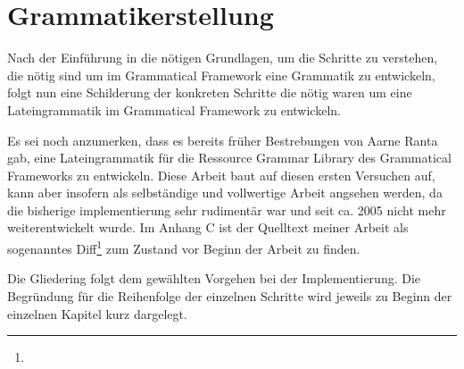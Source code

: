 \documentclass[12pt,abstract=on,titlepage,bibliography=totoc,ngerman,listof=totoc]{scrreprt}
\begin{document}
\chapter{Grammatikerstellung}
\label{chap:grammatik}
Nach der Einführung in die nötigen Grundlagen, um die Schritte zu verstehen, die nötig sind um im Grammatical Framework eine Grammatik zu entwickeln, folgt nun eine Schilderung der konkreten Schritte die nötig waren um eine Lateingrammatik im Grammatical Framework zu entwickeln. \par
Es sei noch anzumerken, dass es bereits früher Bestrebungen von Aarne Ranta gab, eine Lateingrammatik für die Ressource Grammar Library des Grammatical Frameworks zu entwickeln. Diese Arbeit baut auf diesen ersten Versuchen auf, kann aber insofern als selbständige und vollwertige Arbeit angsehen werden, da die bisherige implementierung sehr rudimentär war und seit ca. 2005 nicht mehr weiterentwickelt wurde. Im Anhang C ist der Quelltext meiner Arbeit als sogenanntes Diff\footnote{} zum Zustand vor Beginn der Arbeit zu finden. \par
Die Gliedering folgt dem gewählten Vorgehen bei der Implementierung. Die Begründung für die Reihenfolge der einzelnen Schritte wird jeweils zu Beginn der einzelnen Kapitel kurz dargelegt.
\pagebreak
\end{document}
